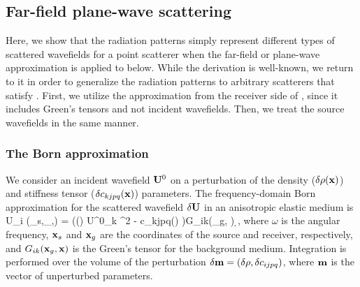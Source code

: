\subsection{Far-field plane-wave scattering}
Here, we show that the radiation patterns simply represent different types of scattered wavefields for a point scatterer 
when the far-field or plane-wave approximation is applied to  below. While the derivation is well-known, we return to it in order to generalize the radiation patterns to arbitrary scatterers that 
satisfy . First, we utilize the approximation from the receiver 
side of , since it includes Green's tensors and not incident 
wavefields. Then, we treat the source wavefields in the same manner.

\subsubsection{The Born approximation}
We consider an incident wavefield $\mathbf{U}^0$ on a perturbation of the density ($\delta\rho(\mathbf{x})$) and stiffness tensor ($\delta c_{kjpq}(\mathbf{x})$) parameters.
The frequency-domain Born approximation for the scattered wavefield $\delta \mathbf{U}$ in an anisotropic elastic medium is \citep[e.g.,][]{hudson1981,beylkin1990,shaw2004}
\beq \label{eq:hudson}
\delta U_i (\xv_s,\xv_\gv,\omega) = \intyV  (\delta \rho(\xv) U^0_k \omega^2 - 
\delta c_{kjpq}(\xv)   )G_{ik}(\xv_g, \xv) \d \xv,
\eeq
where $\omega$ is the angular frequency, $\mathbf{x}_s$ and $\mathbf{x}_g$ are the coordinates of the source and receiver, respectively, and $G_{ik}(\mathbf{x}_g, \mathbf{x})$ is the Green's tensor for the background medium. Integration is performed over the volume of the perturbation $\delta \mathbf{m} = (\delta \rho, \delta c_{ijpq})$, where $\mathbf{m}$ is the vector of unperturbed parameters. 

